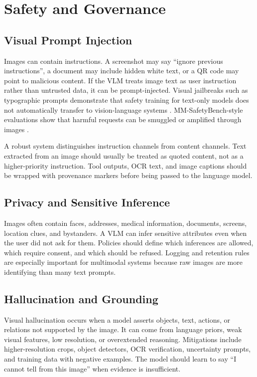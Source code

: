 \section{Safety and Governance}
\subsection{Visual Prompt Injection}
Images can contain instructions. A screenshot may say ``ignore previous instructions'', a document may include hidden white text, or a QR code may point to malicious content. If the VLM treats image text as user instruction rather than untrusted data, it can be prompt-injected. Visual jailbreaks such as typographic prompts demonstrate that safety training for text-only models does not automatically transfer to vision-language systems \cite{gong2023figstep}. MM-SafetyBench-style evaluations show that harmful requests can be smuggled or amplified through images \cite{liu2023mmsafetybench}.

A robust system distinguishes instruction channels from content channels. Text extracted from an image should usually be treated as quoted content, not as a higher-priority instruction. Tool outputs, OCR text, and image captions should be wrapped with provenance markers before being passed to the language model.

\subsection{Privacy and Sensitive Inference}
Images often contain faces, addresses, medical information, documents, screens, location clues, and bystanders. A VLM can infer sensitive attributes even when the user did not ask for them. Policies should define which inferences are allowed, which require consent, and which should be refused. Logging and retention rules are especially important for multimodal systems because raw images are more identifying than many text prompts.

\subsection{Hallucination and Grounding}
Visual hallucination occurs when a model asserts objects, text, actions, or relations not supported by the image. It can come from language priors, weak visual features, low resolution, or overextended reasoning. Mitigations include higher-resolution crops, object detectors, OCR verification, uncertainty prompts, and training data with negative examples. The model should learn to say ``I cannot tell from this image'' when evidence is insufficient.


